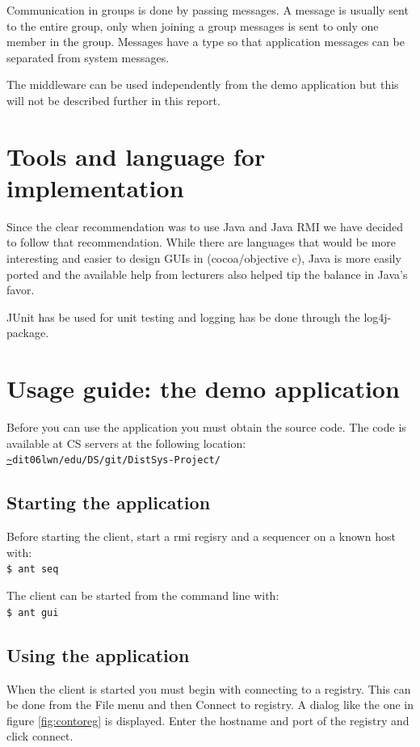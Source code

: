 \documentclass[a4paper,english]{article}
\begin{document}
Communication in groups is done by passing messages. A message is usually sent to the entire group, only when joining a group messages is sent to only one member in the group. Messages have a type so that application messages can be separated from system messages. 

The middleware can be used independently from the demo application but this will not be described further in this report.


\section{Tools and language for implementation}
Since the clear recommendation was to use Java and Java RMI we have decided to follow that recommendation. While there are languages that would be more interesting and easier to design GUIs in (cocoa/objective c), Java is more easily ported and the available help from lecturers also helped tip the balance in Java's favor.

JUnit has be used for unit testing and logging has be done through the log4j-package. 

\section{Usage guide: the demo application}
Before you can use the application you must obtain the source code. The code is available at CS servers at the following location:
{\tt \url{~}dit06lwn/edu/DS/git/DistSys-Project/}

\subsection{Starting the application}
Before starting the client, start a rmi regisry and a sequencer on a known host with:\\
{\tt \$ ant seq}

The client can be started from the command line with:\\
{\tt \$ ant gui}

\subsection{Using the application}
When the client is started you must begin with connecting to a registry. This can be done from the File menu and then Connect to registry. A dialog like the one in figure \vref{fig:contoreg} is displayed. Enter the hostname and port of the registry and click connect.
\end{document}
